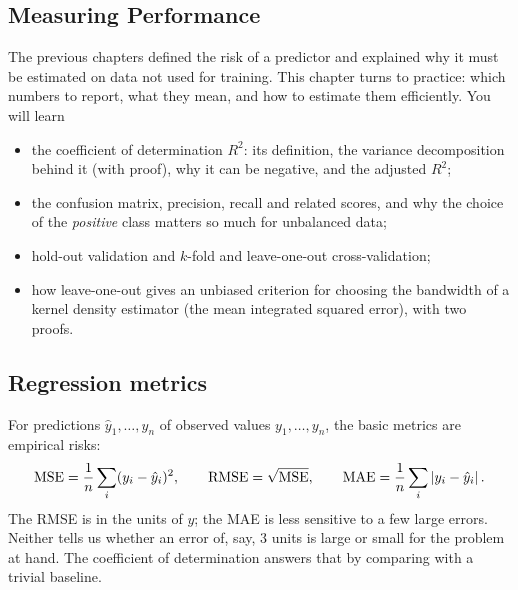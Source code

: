 \begin{notechapter}
\chapter{Measuring Performance}\label{ch:measuring-performance}

\begin{chapterintro}
The previous chapters defined the risk of a predictor and explained why it must
be estimated on data not used for training. This chapter turns to practice:
which numbers to report, what they mean, and how to estimate them efficiently.
You will learn
\begin{itemize}[nosep]
  \item the coefficient of determination $R^2$: its definition, the variance
        decomposition behind it (with proof), why it can be negative, and the
        adjusted $R^2$;
  \item the confusion matrix, precision, recall and related scores, and why
        the choice of the \emph{positive} class matters so much for unbalanced
        data;
  \item hold-out validation and $k$-fold and leave-one-out cross-validation;
  \item how leave-one-out gives an unbiased criterion for choosing the
        bandwidth of a kernel density estimator (the mean integrated squared
        error), with two proofs.
\end{itemize}
\end{chapterintro}

\section{Regression metrics}\label{measuring-performance:sec:regression}

For predictions $\hat y_1,\dots,\hat y_n$ of observed values $y_1,\dots,y_n$,
the basic metrics are empirical risks:
\[
  \mathrm{MSE} = \frac1n\sum_i(y_i - \hat y_i)^2,\qquad
  \mathrm{RMSE} = \sqrt{\mathrm{MSE}},\qquad
  \mathrm{MAE} = \frac1n\sum_i\left|y_i - \hat y_i\right|.
\]
The RMSE is in the units of $y$; the MAE is less sensitive to a few large
errors. Neither tells us whether an error of, say, $3$ units is large or small
for the problem at hand. The coefficient of determination answers that by
comparing with a trivial baseline.


\end{notechapter}
